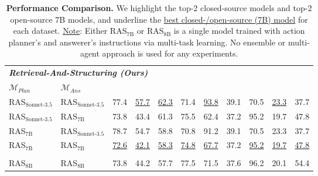 \begin{table*}[t]
{\begin{tabular}{llccccccccc}
\midrule
\multicolumn{9}{l}{\textbf{\textit{Retrieval-And-Structuring (Ours)}}} \\
$\mathcal{M}_{Plan}$  & $\mathcal{M}_{Ans}$ \\
RAS$_{\text{Sonnet-3.5}}$ & RAS$_{\text{Sonnet-3.5}}$ &\textcolor{secondclose}{77.4} & \textcolor{firstclose}{\underline{57.7}} &\textcolor{firstclose}{\underline{62.3}} & \textcolor{secondclose}{71.4} &\textcolor{firstclose}{\underline{93.8}}   &\textcolor{secondclose}{39.1} & \textcolor{secondclose}{70.5}  &\textcolor{firstclose}{\underline{23.3}}  &\textcolor{secondclose}{37.7}   \\
RAS$_{\text{Sonnet-3.5}}$ & RAS$_{7\text{B}}$ &73.8 &43.4 &61.3 &75.5 & 62.4 & 37.2 &95.2  &19.7 & 47.8\\
RAS$_{7\text{B}}$ & RAS$_{\text{Sonnet-3.5}}$ &78.7  &54.7 &58.8  &70.8 &91.2 &39.1 &70.5  & 23.3 &37.7\\
RAS$_{7\text{B}}$ & RAS$_{7\text{B}}$  &\textcolor{firstopen}{\underline{72.6}} &\textcolor{firstopen}{\underline{42.1}} &\textcolor{firstopen}{\underline{58.3}}  &\textcolor{secondopen}{\underline{74.8}} &\textcolor{firstopen}{\underline{67.7}} &\textcolor{firstopen}{37.2} &\textcolor{secondopen}{\underline{95.2}} & \textcolor{firstopen}{\underline{19.7}} &\textcolor{secondopen}{\underline{47.8}} \\[2pt]
\hdashline[2pt/2pt] \\ [-9pt]
RAS$_{8\text{B}}$ & RAS$_{8\text{B}}$  &73.8 & 44.2 &57.7 &77.5 & 71.5 &37.6 &96.2 &20.1 &54.4 \\
\bottomrule
\end{tabular}
}
\vspace{-0.5em}
\caption{\textbf{Performance Comparison.} We highlight the \textcolor{firstclose}{top-2 closed-source models} and \textcolor{firstopen}{top-2 open-source 7B models}, and underline the \underline{best closed-/open-source (7B) model} for each dataset. \underline{Note}: Either RAS$_{7\text{B}}$ or RAS$_{8\text{B}}$ is a single model trained with action planner's and answerer's instructions via multi-task learning. No ensemble or multi-agent approach is used for any experiments.}
\label{tb:main_results}
\vspace{-1em}
\end{table*}